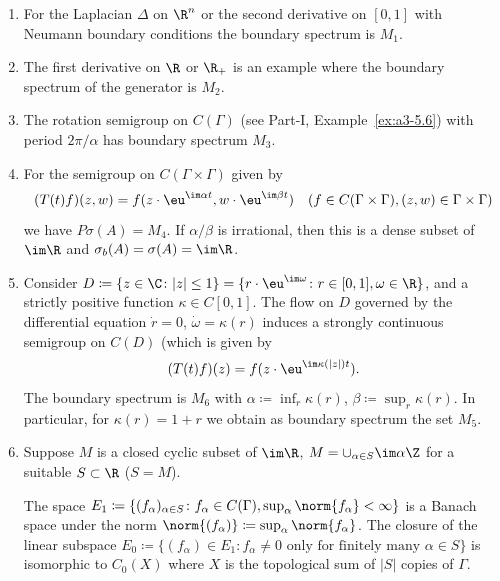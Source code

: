 \begin{examples}\label{ex:b3-2.6}%

\begin{enumerate}[\upshape (i), wide, labelindent=.25em]
\item
For the Laplacian 
 $\Delta$ on $\R^{n}$ or the second derivative on $[0,1]$ with Neumann boundary conditions the boundary spectrum is $M_{1}$.
	
\item
The first derivative on $\R$ or $\R_{+}$ is an example where the boundary spectrum of the generator is $M_{2}$.
	
\item
The rotation semigroup%
 on $C(\Gamma)$ (see Part-I, Example~\ref{ex:a3-5.6}) with period $2\pi/\alpha$ has boundary spectrum $M_{3}$.

\item
For the semigroup on $C(\Gamma \times \Gamma)$ given by
	\[
	(T(t)f)(z,w) = f(z\cdot \eu^{\im\alpha t},w\cdot \eu^{\im\beta  t}) \quad (f \in C(\Gamma \times \Gamma), (z,w) \in \Gamma \times \Gamma)
	\]
	we have $P\sigma(A) = M_{4}$.
	If\/ $\alpha/\beta$ is irrational, then this is a dense subset of\/ $\im \R$ and $\sigma_{b}(A) = \sigma(A) = \im\R$.
	
\item
Consider $D \coloneqq \{z \in \C \colon |z| \leq 1\} = \{r\cdot \eu^{\im\omega} \colon r \in [0,1], \omega \in \R\}$, and a strictly positive function $\kappa \in C[0,1]$.
	The flow on $D$ governed by the differential equation $\dot{r} = 0$, $\dot{\omega} = \kappa(r)$ induces a strongly continuous semigroup on $C(D)$ (which is given by
	\[
	(T(t)f)(z) = f(z\cdot \eu^{\im\kappa(|z|)t}).
	\]
	The boundary spectrum is $M_{6}$ with $\alpha \coloneqq \inf_r \kappa(r)$, $\beta \coloneqq \sup_r \kappa(r)$.
	In particular, for $\kappa(r) = 1 + r$ we obtain as boundary spectrum the set $M_{5}$.
	
\item
Suppose $M$ is a closed cyclic subset of\/ $\im \R$, $M = \cup_{\alpha \in S} \im\alpha\Z$ for a suitable $S \subset \R$ (\eg $S = M$).
	
	The space $E_{1} \coloneqq \{(f_{\alpha})_{\alpha \in S} \colon f_{\alpha} \in C(\Gamma), \sup_\alpha \norm{f_{\alpha}} < \infty\}$ is a Banach space under the norm $\norm{(f_{\alpha})} \coloneqq \sup_\alpha \norm{f_{\alpha}}$.
	The closure of the linear subspace $E_{0} \coloneqq \{(f_{\alpha}) \in E_{1} \colon f_{\alpha} \neq 0 \text{ only for finitely many } \alpha \in S\}$ is isomorphic to $C_{0}(X)$ where $X$ is the topological sum of\/ $|S|$ copies of\/ $\Gamma$.
	

\end{enumerate}
\end{examples}

